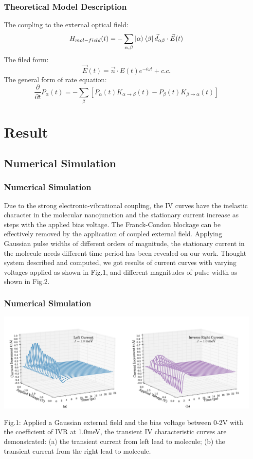 \documentclass{beamer}
\begin{document}
\begin{frame}
\frametitle{Theoretical Model Description}
The coupling to the external optical field:
\begin{equation}
    H_{mol-field}(t)=-\sum_{\alpha,\beta}\ket{\alpha}\bra{\beta}\vec{d}_{\alpha\beta}\cdot\vec{E}(t)
\end{equation}
The filed form:
\begin{equation}
    \vec{E}(t) = \vec{n}\cdot E(t)e^{-i\omega t} + c.c.
\end{equation}
The general form of rate equation:
\begin{equation}
    \frac{\partial}{\partial t} P_{\alpha}(t) = -\sum_{\beta}\left[P_{\alpha}(t) K_{\alpha\rightarrow\beta}(t)-P_{\beta}(t) K_{\beta\rightarrow \alpha}(t)\right]
\end{equation}
\end{frame}

\section{Result}

    \subsection{Numerical Simulation}

\begin{frame}
\frametitle{Numerical Simulation}
Due to the strong electronic-vibrational coupling, the IV curves have the inelastic character in the molecular nanojunction and the stationary current increase as steps with the applied bias voltage. The Franck-Condon blockage can be effectively removed by the application of coupled external field. Applying Gaussian pulse widths of different orders of magnitude, the stationary current in the molecule needs different time period has been revealed on our work. Thought system described and computed, we got results of current curves with varying voltages applied as shown in Fig.1, and different magnitudes of pulse width as shown in Fig.2.  
\end{frame}

\begin{frame}
\frametitle{Numerical Simulation}
\includegraphics[scale=0.05]{F1.png}
\par Fig.1: Applied a Gaussian external field and the bias voltage between 0-2V with the coefficient of IVR at 1.0meV, the transient IV characteristic curves are demonstrated: (a) the transient current from left lead to molecule; (b) the transient current from the right lead to molecule. 
\end{frame}
\end{document}
